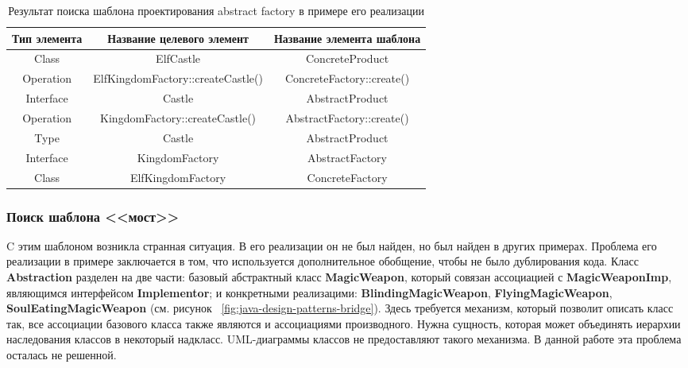 \begin{table}[ht!]
    \centering
    \begin{tabulary}{\textwidth}{|C|C|C|}
        \hline
        Тип элемента & Название целевого элемент & Название элемента шаблона \\
        \hline
        Class & ElfCastle & ConcreteProduct \\
        \hline
        Operation & ElfKingdomFactory::createCastle() & ConcreteFactory::create() \\
        \hline
        Interface & Castle & AbstractProduct \\
        \hline
        Operation & KingdomFactory::createCastle() & AbstractFactory::create() \\
        \hline
        Type & Castle & AbstractProduct \\
        \hline
        Interface & KingdomFactory & AbstractFactory \\
        \hline
        Class & ElfKingdomFactory & ConcreteFactory \\
        \hline
    \end{tabulary}
    \caption{Результат поиска шаблона проектирования abstract factory в примере его реализации}
    \label{table:java-design-patterns-abstract-factory}
\end{table}

\subsubsection{Поиск шаблона <<мост>>}

C этим шаблоном возникла странная ситуация.
В его реализации он не был найден, но был найден в других примерах.
Проблема его реализации в примере заключается в том,
что используется дополнительное обобщение,
чтобы не было дублирования кода.
Класс \textbf{Abstraction} разделен на две части: базовый абстрактный класс
\textbf{MagicWeapon},
который совязан ассоциацией с \textbf{MagicWeaponImp},
являющимся интерфейсом \textbf{Implementor};
и конкретными реализацими: \textbf{BlindingMagicWeapon},
\textbf{FlyingMagicWeapon}, \textbf{SoulEatingMagicWeapon}
(см. рисунок ~\ref{fig:java-design-patterns-bridge}).
Здесь требуется механизм, который позволит описать класс так,
все ассоциации базового класса также являются и ассоциациями производного.
Нужна сущность, которая может объединять иерархии наследования классов в
некоторый надкласс.
UML-диаграммы классов не предоставляют такого механизма.
В данной работе эта проблема осталась не решенной.

